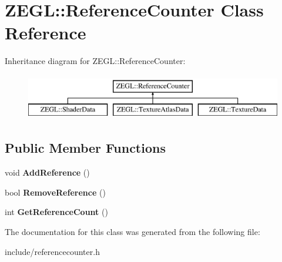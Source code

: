 \hypertarget{class_z_e_g_l_1_1_reference_counter}{}\section{Z\+E\+G\+L\+:\+:Reference\+Counter Class Reference}
\label{class_z_e_g_l_1_1_reference_counter}
Inheritance diagram for Z\+E\+G\+L\+:\+:Reference\+Counter\+:\begin{figure}[H]
\begin{center}
\leavevmode
\includegraphics[height=2.000000cm]{class_z_e_g_l_1_1_reference_counter}
\end{center}
\end{figure}
\subsection*{Public Member Functions}
\begin{DoxyCompactItemize}
\item 
\hypertarget{class_z_e_g_l_1_1_reference_counter_ad417d34164157e8478947a94cd118e29}{}void {\bfseries Add\+Reference} ()\label{class_z_e_g_l_1_1_reference_counter_ad417d34164157e8478947a94cd118e29}

\item 
\hypertarget{class_z_e_g_l_1_1_reference_counter_a3118c4d9747b185355b81c033b2fd099}{}bool {\bfseries Remove\+Reference} ()\label{class_z_e_g_l_1_1_reference_counter_a3118c4d9747b185355b81c033b2fd099}

\item 
\hypertarget{class_z_e_g_l_1_1_reference_counter_a85b5de15d7d2549c17ab2c3f4b29ab01}{}int {\bfseries Get\+Reference\+Count} ()\label{class_z_e_g_l_1_1_reference_counter_a85b5de15d7d2549c17ab2c3f4b29ab01}

\end{DoxyCompactItemize}


The documentation for this class was generated from the following file\+:\begin{DoxyCompactItemize}
\item 
include/referencecounter.\+h\end{DoxyCompactItemize}

